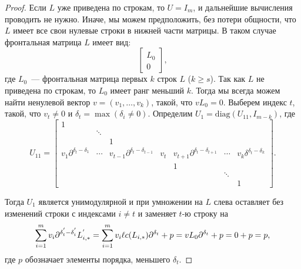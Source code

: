        \begin{proof}
            Если $L$ уже приведена по строкам, то $U=I_m$, и дальнейшие вычисления
            проводить не нужно. Иначе, мы можем предположить, без потери общности, 
            что $L$ имеет все свои нулевые строки в нижней части матрицы. В таком 
            случае фронтальная матрица $L$ имеет вид:
            $$\left[
                \begin{array}{cc}
                    L_0 \\ \hline 0
                \end{array}
            \right],$$
            где $L_0$~--- фронтальная матрица первых $k$ строк $L$ ($k \geq s$). 
            Так как $L$ не приведена по строкам, то $L_0$ имеет ранг меньший $k$. 
            Тогда мы всегда можем найти ненулевой вектор $v=(v_1,\ldots ,v_k)$, 
            такой, что $vL_0=0$. Выберем индекс $t$, такой, что $v_t \neq 0$ и 
            $\delta_t=\max(\delta_i \neq 0)$. Определим $U_1 = 
            \mathrm{diag}(U_{11},I_{m-k})$, где
            $$U_{11}=\left[
                    \begin{array}{ccccccc}
                        1 & & & & & &\\
                        & \ddots & & & & &\\
                        & & 1 & & & &\\
                        v_1\partial^{\delta_t-\delta_1} & \cdots & v_{t-1}\partial^{\delta_t-\delta_{t-1}} & v_t & v_{t+1}\partial^{\delta_t-\delta_{t+1}} & \cdots & v_k\delta^{\delta_t-\delta_k}\\
                        & & & & 1 & &\\
                        & & & & & \ddots &\\
                        & & & & & & 1
                    \end{array}
                \right].$$


            Тогда $U_1$ является унимодулярной и при умножении на $L$ слева оставляет
            без изменений строки с индексами $i\neq t$ и заменяет $t$-ю строку на 
            $$\sum\limits_{i=1}^m v_i\partial^{\delta_t^{'}-\delta_i^{'}}L_{i,*}^{'}
                =\sum\limits_{i=1}^m v_i\ell c(L_{i,*})\partial^{\delta_t}+p 
                =vL_0\partial^{\delta_t}+p=0+p=p,$$
            где $p$ обозначает элементы порядка, меньшего $\delta_t$.



\end{proof}
